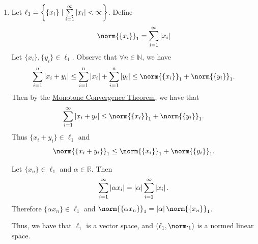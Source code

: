 \documentclass[notoc,notitlepage]{tufte-book}
\begin{document}
\begin{eg}\label{eg:sequence_spaces}
  \begin{enumerate}
    \item Let $\ell_1 = \left\{ \{ x_i \} \mid \sum\limits_{i=1}^{\infty} \left|x_i\right| < \infty \right\}$. Define
      \begin{equation*}
        \norm{ \{ x_i \} }_1 = \sum_{i=1}^{\infty} \abs{x_i}
      \end{equation*}
      Let $\{ x_i \}, \{ y_i \} \in \ell_1$. Observe that $\forall n \in \mathbb{N}$, we have
      \begin{equation*}
        \sum_{i=1}^{n} \abs{x_i + y_i} \leq \sum_{i=1}^{n} \abs{x_i} + \sum_{i=1}^{n} \abs{y_i} \leq \norm{ \{ x_i \} }_1 + \norm{ \{ y_i \} }_1.
      \end{equation*}
      Then by the \hyperref[thm:monotone_convergence_theorem]{Monotone Convergence Theorem}, we have that
      \begin{equation*}
        \sum_{i=1}^{\infty} \abs{x_i + y_i} \leq \norm{ \{ x_i \} }_1 + \norm{ \{ y_i \} }_1.
      \end{equation*}
      Thus $\{ x_i + y_i \} \in \ell_1$ and
      \begin{equation*}
        \norm{ \{ x_i + y_i \} }_1 \leq \norm{ \{ x_i \} }_1 + \norm{ \{ y_i \} }_1.
      \end{equation*}

      Let $\{ x_n \} \in \ell_1$ and $\alpha \in \mathbb{R}$. Then
      \begin{equation*}
        \sum_{i=1}^{\infty} \left| \alpha x_i \right| = \left|\alpha\right| \sum_{i=1}^{\infty} \left|x_i\right|.
      \end{equation*}
      Therefore $\{ \alpha x_n \} \in \ell_1$ and $\norm{ \{ \alpha x_n \} }_1 = \abs{\alpha} \norm{ \{ x_n \} }_1$.

      Thus, we have that $\ell_1$ is a vector space, and $(\ell_1, \norm\cdot_1)$ is a normed linear space.


\end{enumerate}
\end{eg}
\end{document}
